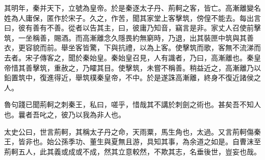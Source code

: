 其明年，秦并天下，立號為皇帝。於是秦逐太子丹、荊軻之客，皆亡。高漸離變名姓為人庸保，匿作於宋子。久之，作苦，聞其家堂上客擊筑，傍偟不能去。每出言曰，彼有善有不善。從者以告其主，曰，彼庸乃知音，竊言是非。家丈人召使前擊筑，一坐稱善，賜酒。而高漸離念久隱畏約無窮時，乃退，出其裝匣中筑與其善衣，更容貌而前。舉坐客皆驚，下與抗禮，以為上客。使擊筑而歌，客無不流涕而去者。宋子傳客之，聞於秦始皇。秦始皇召見，人有識者，乃曰，高漸離也。秦皇帝惜其善擊筑，重赦之，乃矐其目。使擊筑，未嘗不稱善。稍益近之，高漸離乃以鉛置筑中，復進得近，舉筑樸秦皇帝，不中。於是遂誅高漸離，終身不復近諸侯之人。

魯句踐已聞荊軻之刺秦王，私曰，嗟乎，惜哉其不講於刺劍之術也。甚矣吾不知人也。曩者吾叱之，彼乃以我為非人也。

太史公曰，世言荊軻，其稱太子丹之命，天雨粟，馬生角也，太過。又言荊軻傷秦王，皆非也。始公孫季功、董生與夏無且游，具知其事，為余道之如是。自曹沫至荊軻五人，此其義或成或不成，然其立意較然，不欺其志，名垂後世，豈妄也哉。